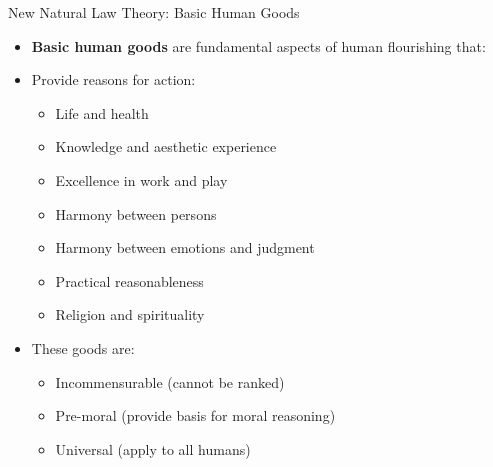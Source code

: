 \documentclass{beamer}
\begin{document}
\begin{frame}{New Natural Law Theory: Basic Human Goods}
    \begin{itemize}
        \item \textbf{Basic human goods} are fundamental aspects of human flourishing that:
        
        \item Provide reasons for action:
        \begin{itemize}
            \item Life and health
            \item Knowledge and aesthetic experience
            \item Excellence in work and play
            \item Harmony between persons
            \item Harmony between emotions and judgment
            \item Practical reasonableness
            \item Religion and spirituality
        \end{itemize}
        
        \item These goods are:
            \begin{itemize}
                \item Incommensurable (cannot be ranked)
                \item Pre-moral (provide basis for moral reasoning)
                \item Universal (apply to all humans)
            \end{itemize}
    \end{itemize}
\end{frame}
\end{document}
